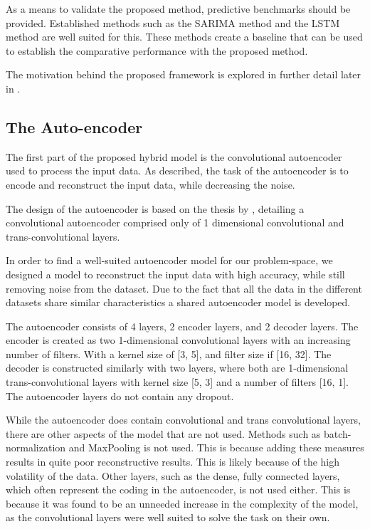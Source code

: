 As a means to validate the proposed method, predictive benchmarks should be provided.
Established methods such as the SARIMA method and the LSTM method are well suited for this.
These methods create a baseline that can be used to establish the comparative performance with the proposed method.

The motivation behind the proposed framework is explored in further detail later in .



\subsection{The Auto-encoder}

The first part of the proposed hybrid model is the convolutional autoencoder used to process the input data.
As described, the task of the autoencoder is to encode and reconstruct the input data,
while decreasing the noise.

The design of the autoencoder is based on the thesis by \cite{Zhao2019},
detailing a convolutional autoencoder comprised only of 1 dimensional convolutional and trans-convolutional layers.


In order to find a well-suited autoencoder model for our problem-space,
we designed a model to reconstruct the input data with high accuracy,
while still removing noise from the dataset.
Due to the fact that all the data in the different datasets share similar characteristics
a shared autoencoder model is developed.

The autoencoder consists of 4 layers, 2 encoder layers, and 2 decoder layers.
The encoder is created as two 1-dimensional convolutional layers with an increasing number of filters.
With a kernel size of [3, 5], and filter size if [16, 32].
The decoder is constructed similarly with two layers, where both are 1-dimensional trans-convolutional layers
with kernel size [5, 3] and a number of filters [16, 1].
The autoencoder layers do not contain any dropout.


While the autoencoder does contain convolutional and trans convolutional layers,
there are other aspects of the model that are not used.
Methods such as batch-normalization and MaxPooling is not used.
This is because adding these measures results in quite poor reconstructive results.
This is likely because of the high volatility of the data.
Other layers, such as the dense, fully connected layers, which often represent the coding in the autoencoder,
is not used either.
This is because it was found to be an unneeded increase in the complexity of the model,
as the convolutional layers were well suited to solve the task on their own.


